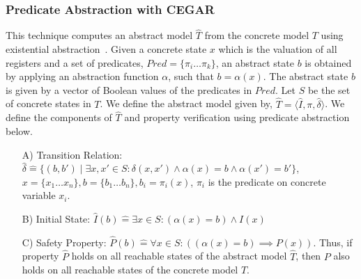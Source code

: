 

\subsubsection{Predicate Abstraction with CEGAR}
%
This technique computes an abstract model $\hat{T}$ from the concrete model
$T$ using existential abstraction~\cite{cav97,cav2000}. 
%
Given a concrete state $x$ which is the 
valuation of all registers and a set of 
predicates, $Pred=\{\pi_{i} \ldots \pi_{k}\}$, 
an abstract state $b$ is obtained by applying 
an abstraction function $\alpha$, such that $b=\alpha(x)$.  
%
The abstract state $b$ is given by a vector 
of Boolean values of the predicates in $Pred$. 
%
Let $S$ be the set of concrete states in $T$. 
%
We define the abstract model given by, 
$\hat{T} = \langle \hat{I}, \pi, \hat{\delta} \rangle$.  
We define the components of $\hat{T}$ and property 
verification using predicate abstraction below. 
%
\begin{enumerate}
\item [A)] Transition Relation: $\hat{\delta} \mathrel{\hat{=}} \{(b,b') \mid \exists x,x' \in S: \delta(x,x') 
\wedge \alpha(x) = b \wedge \alpha(x') = b' \} $, $x=\{x_1 \ldots x_n\}, 
b=\{b_1 \ldots b_n\}, b_i=\pi_{i}(x) $, $\pi_i$ is the predicate on concrete variable $x_i$.

\item [B)] Initial State: $\hat{I}(b) \mathrel{\hat{=}} 
\exists x \in S: (\alpha(x) = b) \wedge I(x)$

\item [C)] Safety Property: $\hat{P}(b) \mathrel{\hat{=}} 
\forall x \in S: ((\alpha(x) = b) \implies P(x))$.  
Thus, if property $\hat{P}$ holds on all reachable states of the abstract model $\hat{T}$, then $P$ also holds on all reachable states of the concrete model $T$.
\end{enumerate}


